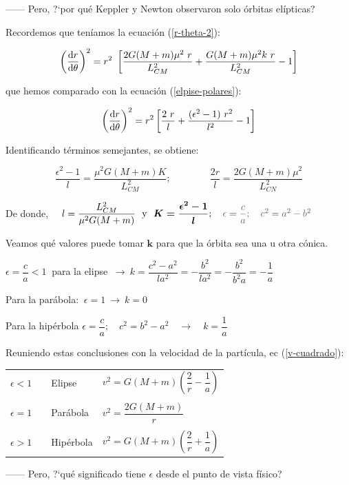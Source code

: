 ------ Pero, ?`por qué Keppler y Newton observaron solo órbitas elípticas?

Recordemos que teníamos la ecuación (\ref{r-theta-2}):  

$$\left( \dv{r}{\theta} \right)^2 = r^2 \ \left[ \dfrac{2G(M+m)\mu^2\ r}{L^2_{CM}}+ \dfrac{G(M+m) \mu^2 k \ r}{L^2_{CM}} - 1   \right]$$

que hemos comparado con la ecuación (\ref{elpise-polares}):

$$\left( \dv{r}{\theta} \right)^2 = r^2  \left[ \dfrac{2 \ r}{l}+\dfrac{(\epsilon^2-1) \ r^2}{l^2} - 1 \right]	$$

Identificando términos semejantes, se obtiene:

$$\dfrac {\epsilon^2-1}{l}=	\dfrac{\mu^2 G (M+m) K}{L^2_{CM}}; \qquad \qquad \dfrac{2r}{l}=\dfrac{2G(M+m)\mu^2}{L^2_{CN}} $$

De donde, $\quad l=\dfrac {L^2_{CM}}{\mu^2 G (M+m)} \ \text{ y } \ \boldsymbol{K= \dfrac{\epsilon^2-1}{l}}; \quad  \textcolor{gris}{\epsilon=\dfrac c a ;\quad c^2=a^2-b^2}$	

Veamos qué valores puede tomar $\boldsymbol k$ para que la órbita sea una u otra cónica.

$\epsilon =\dfrac c a < 1\ $ para la elipse $\ \to \ k=\dfrac{c^2-a^2}{la^2}=-\dfrac{b^2}{la^2}=-\dfrac{b^2}{b^2a}=-\dfrac 1 a$

Para la parábola: $\ \epsilon=1 \ \to \ k=0$

Para la hipérbola $\epsilon=\dfrac c a;\quad c^2=b^2-a^2 \quad \to \quad k=\dfrac 1 a $

Reuniendo estas conclusiones con la velocidad de la partícula, ec (\ref{v-cuadrado}):

\begin{miparrafodestacado}
\begin{table}[H]
\centering
\begin{tabular}{lll}
$\epsilon<1\quad$ & Elipse$\quad$ & $v^2=G(M+m)\left(\dfrac 2 r-\dfrac 1 a \right)$ \\ \\
$\epsilon=1$      & Parábola      & $v^2=\dfrac{2G(M+m)}{r}$                        \\ \\
$\epsilon>1$      & Hipérbola     & $v^2=G(M+m)\left(\dfrac 2 r+\dfrac 1 a \right)$
\end{tabular}
\end{table}	
\end{miparrafodestacado}

------ Pero, ?`qué significado tiene $\epsilon$ desde el punto de vista físico?

